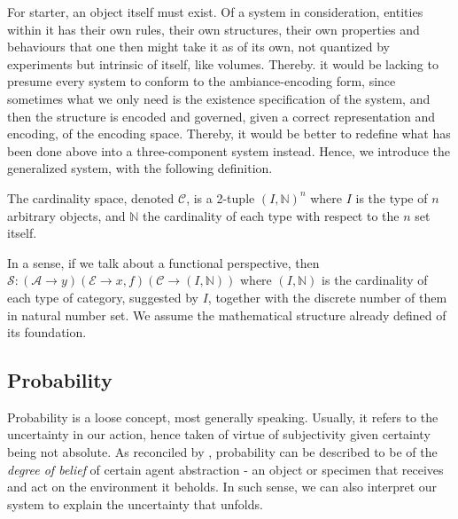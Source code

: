 For starter, an object itself must exist. Of a system in consideration, entities within it has their own rules, their own structures, their own properties and behaviours that one then might take it as of its own, not quantized by experiments but intrinsic of itself, like volumes. Thereby. it would be lacking to presume every system to conform to the ambiance-encoding form, since sometimes what we only need is the existence specification of the system, and then the structure is encoded and governed, given a correct representation and encoding, of the encoding space. Thereby, it would be better to redefine what has been done above into a three-component system instead. Hence, we introduce the generalized system, with the following definition. 

\begin{definition}
  The cardinality space, denoted $\mathcal{C}$, is a 2-tuple $(I,\mathbb{N})^{n}$ where $I$ is the type of $n$ arbitrary objects, and $\mathbb{N}$ the cardinality of each type with respect to the $n$ set itself. 
\end{definition}

\begin{definition}
  
\end{definition}


\begin{definition}
  
\end{definition}

In a sense, if we talk about a functional perspective, then $\mathcal{S}:(\mathcal{A}\to y)(\mathcal{E}\to x,f)(\mathcal{C}\to (I,\mathbb{N}))$ where $(I,\mathbb{N})$ is the cardinality of each type of category, suggested by $I$, together with the discrete number of them in natural number set. We assume the mathematical structure already defined of its foundation. 

\subsection{Probability}

Probability is a loose concept, most generally speaking. Usually, it refers to the uncertainty in our action, hence taken of virtue of subjectivity given certainty being not absolute. As reconciled by \cite{Nau2001_DeFinettiWasRight,deFinetti1990_TheoryProbability,Elliot2019_DeFinettiPhilosophy}, probability can be described to be of the \textit{degree of belief} of certain agent abstraction - an object or specimen that receives and act on the environment it beholds. In such sense, we can also interpret our system to explain the uncertainty that unfolds. 

